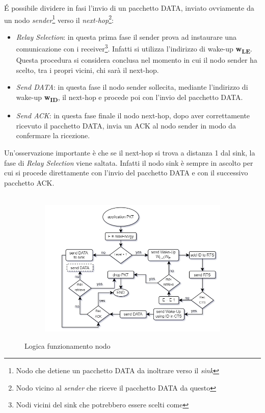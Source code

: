 \'E possibile dividere in fasi l'invio di un  pacchetto DATA, inviato ovviamente da un nodo \textit{sender}\footnote{Nodo che detiene un pacchetto DATA da inoltrare verso il \textit{sink}} verso il \textit{next-hop}\footnote{Nodo vicino al \textit{sender} che riceve il pacchetto DATA da questo}:
\begin{itemize}
    \item \textit{Relay Selection}: in questa prima fase il sender prova ad instaurare una comunicazione con i receiver\footnote{Nodi vicini del sink che potrebbero essere scelti come  }. Infatti si utilizza l'indirizzo di wake-up \textbf{w\textsubscript{LE}}. Questa procedura si considera conclusa nel momento in cui il nodo sender ha scelto, tra i propri vicini, chi sarà il next-hop.
    \item \textit{Send DATA}: in questa fase il nodo sender sollecita, mediante l'indirizzo di wake-up \textbf{w\textsubscript{ID}}, il next-hop e procede poi con l'invio del pacchetto DATA.
    \item \textit{Send ACK}: in questa fase finale il nodo next-hop, dopo aver correttamente ricevuto il pacchetto DATA, invia un ACK al nodo sender in modo da confermare la ricezione.
\end{itemize}
Un'osservazione importante è che se il next-hop si trova a distanza 1 dal sink, la fase di \textit{Relay Selection} viene saltata. Infatti il nodo sink è sempre in ascolto per cui si procede direttamente con l'invio del pacchetto DATA e con il successivo pacchetto ACK.\\\\

\begin{figure}[h!]
  \begin{subfigure}[t]{.8\linewidth}
    \includegraphics[width=1.15\linewidth]{Contents/Images/schemes/greenWupBase/GreenWup_base_sender.png}
  \end{subfigure}
  \caption{Logica funzionamento nodo }
  \label{fig:logicaSender}
\end{figure}

